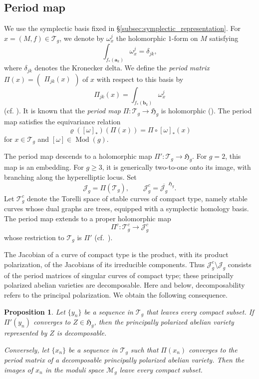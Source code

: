 \documentclass[dvipdfmx]{amsart}
\newtheorem{proposition}{Proposition}[section]
\theoremstyle{remark}
\newcommand{\teich}{\mathcal{T}}
\newcommand{\torelli}{\mathscr{T}}
\newcommand{\tmod}{\operatorname{Mod}}
\newcommand{\symrep}{\mathop{\boldsymbol{\varrho}}}
\begin{document}
\subsection{Period map}
\label{subsec:period_map}
We use the symplectic basis fixed in \S\ref{subsec:symplectic_representation}. 
 For $x=(M,f)\in \teich_{g}$,
 we denote by $\omega_x^j$ the holomorphic $1$-form on $M$ satisfying
\[
\int_{f_*(\mathbf{a}_k)}\omega_x^j=\delta_{jk},
\]
where $\delta_{jk}$ denotes the Kronecker delta. We define the \emph{period matrix} $\Pi(x)=\begin{pmatrix} \Pi_{jk}(x)\end{pmatrix}$ of $x$ with respect to this basis by
\[
\Pi_{jk}(x)=\int_{f_*(\mathbf{b}_k)}\omega_x^j
\]
(cf. \cite{FarkasKra1992}).
It is known that the \emph{period map} $\Pi \colon \teich_{g}\to \mathfrak{H}_g$ is holomorphic (\cite{Ahlfors1960}).
The period map satisfies the equivariance relation
\begin{equation}
\label{eq:symplectic_rep}
\symrep([\omega]_*)(\Pi(x))=\Pi\circ [\omega]_*(x)
\end{equation}
for $x\in \teich_{g}$ and $[\omega]\in \tmod(g)$.

The period map descends to a holomorphic map
$\Pi'\colon \torelli_g\to\mathfrak H_g$.
For $g=2$, this map is an embedding.
For $g\ge3$, it is generically two-to-one onto its image,
with branching along the hyperelliptic locus.
Set
\[
\mathcal{J}_g=\Pi(\teich_g),
\qquad
\mathcal{J}_g^c
=\overline{\mathcal{J}_g}^{\,\mathfrak H_g}.
\]
Let $\torelli_g^c$ denote the Torelli space of stable
curves of compact type, namely stable curves whose
dual graphs are trees, equipped with a symplectic
homology basis.
The period map extends to a proper holomorphic map
\[
\Pi^c\colon\torelli_g^c\longrightarrow \mathcal{J}_g^c
\]
whose restriction to $\torelli_g$ is $\Pi'$
(cf.\ \cite[\S\S2 and 4]{Hain2006}).

The Jacobian of a curve of compact type is the
product, with its product polarization, of the
Jacobians of its irreducible components.
Thus $\mathcal{J}_g^c\setminus \mathcal{J}_g$ consists of the period
matrices of singular curves of compact type;
these principally polarized abelian varieties
are decomposable.
Here and below, decomposability refers to the
principal polarization.
We obtain the following consequence.

\begin{proposition}
\label{prop:compacttype}
Let $\{y_n\}$ be a sequence in $\torelli_g$ that
leaves every compact subset.
If $\Pi'(y_n)$ converges to $Z\in\mathfrak H_g$,
then the principally polarized abelian variety
represented by $Z$ is decomposable.

Conversely, let $\{x_n\}$ be a sequence in $\teich_g$
such that $\Pi(x_n)$ converges to the period matrix
of a decomposable principally polarized abelian
variety.
Then the images of $x_n$ in the moduli space
$\mathcal M_g$ leave every compact subset.
\end{proposition}
\end{document}
